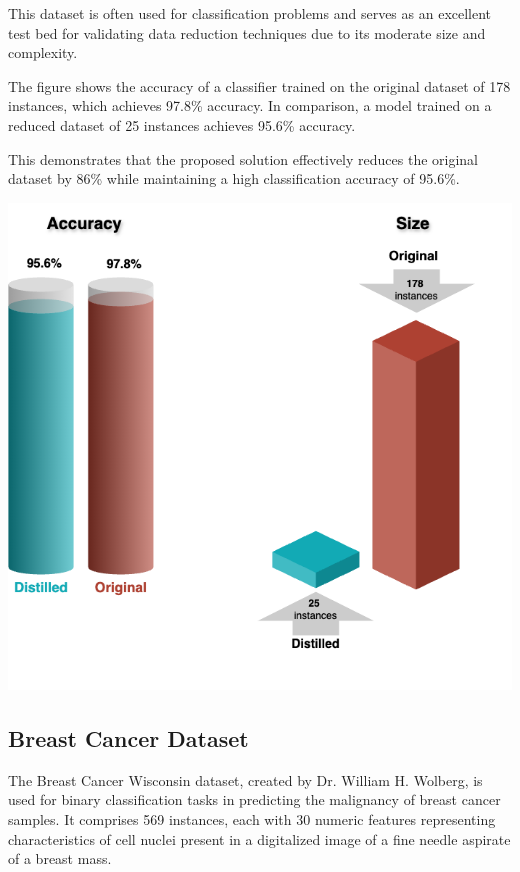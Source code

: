 This dataset is often used for classification problems and serves as an excellent test bed for validating data reduction techniques due to its moderate size and complexity.

\begin{minipage}{0.35\textwidth}
    The figure shows the accuracy of a classifier trained on the original dataset of 178 instances, which achieves 97.8\% accuracy. In comparison, a model trained on a reduced dataset of 25 instances achieves 95.6\% accuracy. 
    
    This demonstrates that the proposed solution effectively reduces the original dataset by 86\% while maintaining a high classification accuracy of 95.6\%.
\end{minipage}
\hspace{0.02\textwidth} %
\begin{minipage}{0.6\textwidth}
    \centering
    \includegraphics[width=\textwidth]{images/wine.png}
\end{minipage}


\subsection{Breast Cancer Dataset}

The Breast Cancer Wisconsin dataset, created by Dr. William H. Wolberg, is used for binary classification tasks in predicting the malignancy of breast cancer samples. It comprises 569 instances, each with 30 numeric features representing characteristics of cell nuclei present in a digitalized image of a fine needle aspirate of a breast mass. 

